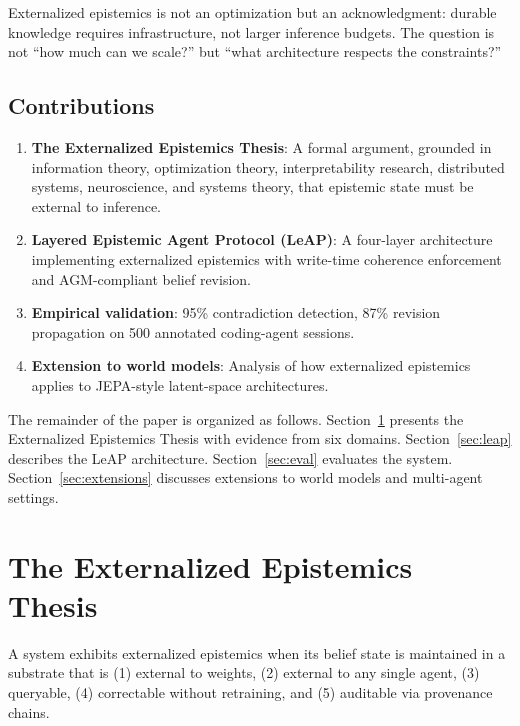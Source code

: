 \documentclass[11pt,letterpaper]{article}
\begin{document}
Externalized epistemics is not an optimization but an acknowledgment: durable knowledge requires infrastructure, not larger inference budgets. The question is not ``how much can we scale?'' but ``what architecture respects the constraints?''

\subsection{Contributions}

\begin{enumerate}[noitemsep]
    \item \textbf{The Externalized Epistemics Thesis}: A formal argument, grounded in information theory, optimization theory, interpretability research, distributed systems, neuroscience, and systems theory, that epistemic state must be external to inference.

    \item \textbf{Layered Epistemic Agent Protocol (LeAP)}: A four-layer architecture implementing externalized epistemics with write-time coherence enforcement and AGM-compliant belief revision.

    \item \textbf{Empirical validation}: 95\% contradiction detection, 87\% revision propagation on 500 annotated coding-agent sessions.

    \item \textbf{Extension to world models}: Analysis of how externalized epistemics applies to JEPA-style latent-space architectures.
\end{enumerate}

The remainder of the paper is organized as follows. Section~\ref{sec:thesis} presents the Externalized Epistemics Thesis with evidence from six domains. Section~\ref{sec:leap} describes the LeAP architecture. Section~\ref{sec:eval} evaluates the system. Section~\ref{sec:extensions} discusses extensions to world models and multi-agent settings.

\section{The Externalized Epistemics Thesis}
\label{sec:thesis}

A system exhibits externalized epistemics when its belief state is maintained in a substrate that is (1) external to weights, (2) external to any single agent, (3) queryable, (4) correctable without retraining, and (5) auditable via provenance chains.
\end{document}
